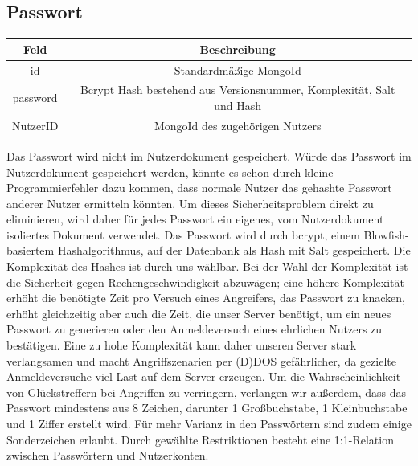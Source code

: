 \subsection{Passwort}
\begin{center}
    \begin{tabular}{ |c|c| }
        \hline
        Feld & Beschreibung  \\
        \hline
        id & Standardmäßige MongoId \\
        password & Bcrypt Hash bestehend aus Versionsnummer, Komplexität, Salt und Hash \\
        NutzerID & MongoId des zugehörigen Nutzers \\
        \hline
    \end{tabular}
    \cite{DB3} \cite{DB4}
\end{center}

Das Passwort wird nicht im Nutzerdokument gespeichert. Würde das Passwort im Nutzerdokument gespeichert werden, könnte es schon durch kleine Programmierfehler dazu kommen, dass normale Nutzer das gehashte Passwort anderer Nutzer ermitteln könnten. Um dieses Sicherheitsproblem direkt zu eliminieren, wird daher für jedes Passwort ein eigenes, vom Nutzerdokument isoliertes Dokument verwendet.
Das Passwort wird durch bcrypt, einem Blowfish-basiertem Hashalgorithmus, auf der Datenbank als Hash mit Salt gespeichert. Die Komplexität des Hashes ist durch uns wählbar. Bei der Wahl der Komplexität ist die Sicherheit gegen Rechengeschwindigkeit abzuwägen; eine höhere Komplexität erhöht die benötigte Zeit pro Versuch eines Angreifers, das Passwort zu knacken, erhöht gleichzeitig aber auch die Zeit, die unser Server benötigt, um ein neues Passwort zu generieren oder den Anmeldeversuch eines ehrlichen Nutzers zu bestätigen. Eine zu hohe Komplexität kann daher unseren Server stark verlangsamen und macht Angriffszenarien per (D)DOS gefährlicher, da gezielte Anmeldeversuche viel Last auf dem Server erzeugen.
Um die Wahrscheinlichkeit von Glückstreffern bei Angriffen zu verringern, verlangen wir außerdem, dass das Passwort mindestens aus 8 Zeichen, darunter 1 Großbuchstabe, 1 Kleinbuchstabe und 1 Ziffer erstellt wird. Für mehr Varianz in den Passwörtern sind zudem einige Sonderzeichen erlaubt.
Durch gewählte Restriktionen besteht eine 1:1-Relation zwischen Passwörtern und Nutzerkonten.

